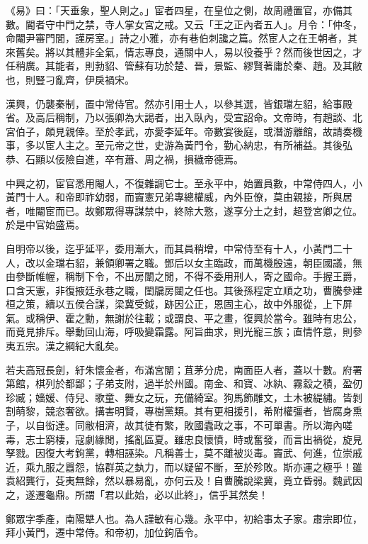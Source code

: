 
\begin{pinyinscope}
《易》曰：「天垂象，聖人則之。」宦者四星，在皇位之側，故周禮置官，亦備其數。閽者守中門之禁，寺人掌女宮之戒。又云「王之正內者五人」。月令：「仲冬，命閹尹審門閭，謹房室。」詩之小雅，亦有巷伯刺讒之篇。然宦人之在王朝者，其來舊矣。將以其體非全氣，情志專良，通關中人，易以役養乎？然而後世因之，才任稍廣。其能者，則勃貂、管蘇有功於楚、晉，景監、繆賢著庸於秦、趙。及其敝也，則豎刁亂齊，伊戾禍宋。

漢興，仍襲秦制，置中常侍官。然亦引用士人，以參其選，皆銀璫左貂，給事殿省。及高后稱制，乃以張卿為大謁者，出入臥內，受宣詔命。文帝時，有趙談、北宮伯子，頗見親倖。至於孝武，亦愛李延年。帝數宴後庭，或潛游離館，故請奏機事，多以宦人主之。至元帝之世，史游為黃門令，勤心納忠，有所補益。其後弘恭、石顯以佞險自進，卒有蕭、周之禍，損穢帝德焉。

中興之初，宦官悉用閹人，不復雜調它士。至永平中，始置員數，中常侍四人，小黃門十人。和帝即祚幼弱，而竇憲兄弟專總權威，內外臣僚，莫由親接，所與居者，唯閹宦而已。故鄭眾得專謀禁中，終除大憝，遂享分土之封，超登宮卿之位。於是中官始盛焉。

自明帝以後，迄乎延平，委用漸大，而其員稍增，中常侍至有十人，小黃門二十人，改以金璫右貂，兼領卿署之職。鄧后以女主臨政，而萬機殷遠，朝臣國議，無由參斷帷幄，稱制下令，不出房闈之閒，不得不委用刑人，寄之國命。手握王爵，口含天憲，非復掖廷永巷之職，閨牖房闥之任也。其後孫程定立順之功，曹騰參建桓之策，續以五侯合謀，梁冀受鉞，跡因公正，恩固主心，故中外服從，上下屏氣。或稱伊、霍之勳，無謝於往載；或謂良、平之畫，復興於當今。雖時有忠公，而竟見排斥。舉動回山海，呼吸變霜露。阿旨曲求，則光寵三族；直情忤意，則參夷五宗。漢之綱紀大亂矣。

若夫高冠長劍，紆朱懷金者，布滿宮闈；苴茅分虎，南面臣人者，蓋以十數。府署第館，棋列於都鄙；子弟支附，過半於州國。南金、和寶、冰紈、霧縠之積，盈仞珍臧；嬙媛、侍兒、歌童、舞女之玩，充備綺室。狗馬飾雕文，土木被緹繡。皆剝割萌黎，競恣奢欲。搆害明賢，專樹黨類。其有更相援引，希附權彊者，皆腐身熏子，以自衒達。同敝相濟，故其徒有繁，敗國蠹政之事，不可單書。所以海內嗟毒，志士窮棲，寇劇緣閒，搖亂區夏。雖忠良懷憤，時或奮發，而言出禍從，旋見孥戮。因復大考鉤黨，轉相誣染。凡稱善士，莫不離被災毒。竇武、何進，位崇戚近，乘九服之囂怨，協群英之埶力，而以疑留不斷，至於殄敗。斯亦運之極乎！雖袁紹龔行，芟夷無餘，然以暴易亂，亦何云及！自曹騰說梁冀，竟立昏弱。魏武因之，遂遷龜鼎。所謂「君以此始，必以此終」，信乎其然矣！

鄭眾字季產，南陽犨人也。為人謹敏有心幾。永平中，初給事太子家。肅宗即位，拜小黃門，遷中常侍。和帝初，加位鉤盾令。


\end{pinyinscope}
